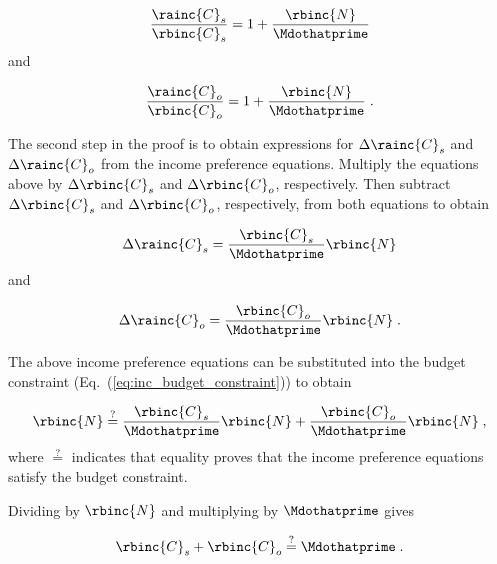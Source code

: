\begin{equation}
    \frac{\rainc{C}_s}{\rbinc{C}_s} = 1 + \frac{\rbinc{N}}{\Mdothatprime}
\end{equation}
%
and

\begin{equation}
  \frac{\rainc{C}_o}{\rbinc{C}_o} = 1 + \frac{\rbinc{N}}{\Mdothatprime} \; .
\end{equation}
%

The second step in the proof is to obtain expressions 
for $\Delta \rainc{C}_s$ and $\Delta \rainc{C}_o$
from the income preference equations.
Multiply the equations above by $\Delta \rbinc{C}_s$ and $\Delta \rbinc{C}_o$, respectively.
Then subtract $\Delta \rbinc{C}_s$ and $\Delta \rbinc{C}_o$, respectively, from both equations to obtain

\begin{equation}
  \Delta \rainc{C}_s = \frac{\rbinc{C}_s}{\Mdothatprime} \rbinc{N}
\end{equation}
%
and

\begin{equation}
  \Delta \rainc{C}_o = \frac{\rbinc{C}_o}{\Mdothatprime} \rbinc{N} \; .
\end{equation}

The above income preference equations can be substituted into the budget constraint
(Eq.~(\ref{eq:inc_budget_constraint})) to obtain

\begin{equation}
  \rbinc{N} \stackrel{?}{=} \frac{\rbinc{C}_s}{\Mdothatprime} \rbinc{N} 
                            + \frac{\rbinc{C}_o}{\Mdothatprime}  \rbinc{N} \; ,
\end{equation}
%
where $\stackrel{?}{=}$ indicates that equality
proves that the income preference equations satisfy the budget constraint.

Dividing by $\rbinc{N}$ and multiplying by $\Mdothatprime$ gives

\begin{equation}
  \rbinc{C}_s + \rbinc{C}_o \stackrel{?}{=} \Mdothatprime \; .
\end{equation}
%


